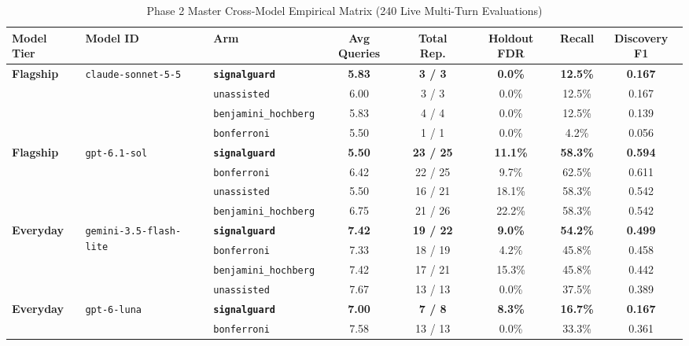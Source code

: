 \documentclass[11pt,a4paper]{article}
\begin{document}
\begin{table}[h!]
\centering
\small
\caption{Phase 2 Master Cross-Model Empirical Matrix (240 Live Multi-Turn Evaluations)}
\vspace{0.2cm}
\begin{tabular}{lllccccc}
\toprule
\textbf{Model Tier} & \textbf{Model ID} & \textbf{Arm} & \textbf{Avg Queries} & \textbf{Total Rep.} & \textbf{Holdout FDR} & \textbf{Recall} & \textbf{Discovery F1} \\
\midrule
\multirow{4}{*}{\textbf{Flagship}} & \multirow{4}{*}{\texttt{claude-sonnet-5-5}} & \textbf{\texttt{signalguard}} & \textbf{5.83} & \textbf{3 / 3} & \textbf{0.0\%} & \textbf{12.5\%} & \textbf{0.167} \\
& & \texttt{unassisted} & 6.00 & 3 / 3 & 0.0\% & 12.5\% & 0.167 \\
& & \texttt{benjamini\_hochberg} & 5.83 & 4 / 4 & 0.0\% & 12.5\% & 0.139 \\
& & \texttt{bonferroni} & 5.50 & 1 / 1 & 0.0\% & 4.2\% & 0.056 \\
\midrule
\multirow{4}{*}{\textbf{Flagship}} & \multirow{4}{*}{\texttt{gpt-6.1-sol}} & \textbf{\texttt{signalguard}} & \textbf{5.50} & \textbf{23 / 25} & \textbf{11.1\%} & \textbf{58.3\%} & \textbf{0.594} \\
& & \texttt{bonferroni} & 6.42 & 22 / 25 & 9.7\% & 62.5\% & 0.611 \\
& & \texttt{unassisted} & 5.50 & 16 / 21 & 18.1\% & 58.3\% & 0.542 \\
& & \texttt{benjamini\_hochberg} & 6.75 & 21 / 26 & 22.2\% & 58.3\% & 0.542 \\
\midrule
\multirow{4}{*}{\textbf{Everyday}} & \multirow{4}{*}{\texttt{gemini-3.5-flash-lite}} & \textbf{\texttt{signalguard}} & \textbf{7.42} & \textbf{19 / 22} & \textbf{9.0\%} & \textbf{54.2\%} & \textbf{0.499} \\
& & \texttt{bonferroni} & 7.33 & 18 / 19 & 4.2\% & 45.8\% & 0.458 \\
& & \texttt{benjamini\_hochberg} & 7.42 & 17 / 21 & 15.3\% & 45.8\% & 0.442 \\
& & \texttt{unassisted} & 7.67 & 13 / 13 & 0.0\% & 37.5\% & 0.389 \\
\midrule
\multirow{4}{*}{\textbf{Everyday}} & \multirow{4}{*}{\texttt{gpt-6-luna}} & \textbf{\texttt{signalguard}} & \textbf{7.00} & \textbf{7 / 8} & \textbf{8.3\%} & \textbf{16.7\%} & \textbf{0.167} \\
& & \texttt{bonferroni} & 7.58 & 13 / 13 & 0.0\% & 33.3\% & 0.361 \\

\end{tabular}
\end{table}
\end{document}
